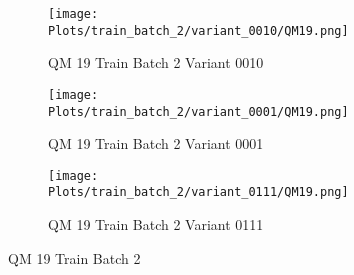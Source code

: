 \documentclass{DissertateFigs}
\begin{document}
\begin{figure}[t!]
\medskip

    \begin{subfigure}{0.47\textwidth}
    \texttt{[image: Plots/train\_batch\_2/variant\_0010/QM19.png]}
    \caption{QM 19 Train Batch 2 Variant 0010}
    \end{subfigure}
    \begin{subfigure}{0.47\textwidth}
    \texttt{[image: Plots/train\_batch\_2/variant\_0001/QM19.png]}
    \caption{QM 19 Train Batch 2 Variant 0001}
    \end{subfigure}

\medskip

    \begin{subfigure}{0.47\textwidth}
    \texttt{[image: Plots/train\_batch\_2/variant\_0111/QM19.png]}
    \caption{QM 19 Train Batch 2 Variant 0111}
    \end{subfigure}
\caption{QM 19 Train Batch 2}
    \end{figure}
\clearpage
\end{document}

